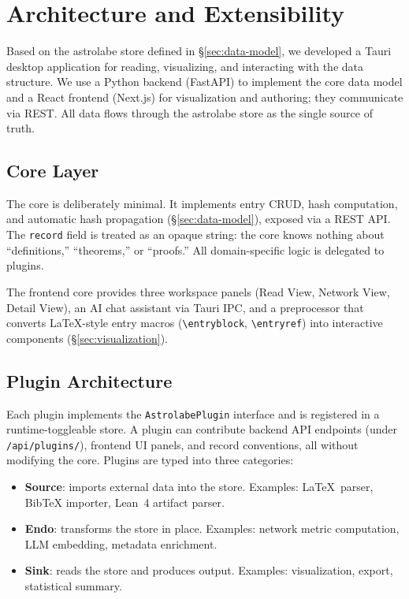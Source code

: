 \section{Architecture and Extensibility}
\label{sec:architecture}

Based on the astrolabe store defined in \S\ref{sec:data-model}, we developed a Tauri desktop application for reading, visualizing, and interacting with the data structure. We use a Python backend (FastAPI) to implement the core data model and a React frontend (Next.js) for visualization and authoring; they communicate via REST. All data flows through the astrolabe store as the single source of truth.

\subsection{Core Layer}

The core is deliberately minimal. It implements entry CRUD, hash computation, and automatic hash propagation (\S\ref{sec:data-model}), exposed via a REST API. The \texttt{record} field is treated as an opaque string: the core knows nothing about ``definitions,'' ``theorems,'' or ``proofs.'' All domain-specific logic is delegated to plugins.

The frontend core provides three workspace panels (Read View, Network View, Detail View), an AI chat assistant via Tauri IPC, and a preprocessor that converts \LaTeX-style entry macros (\verb|\entryblock|, \verb|\entryref|) into interactive components (\S\ref{sec:visualization}).

\subsection{Plugin Architecture}

Each plugin implements the \texttt{AstrolabePlugin} interface and is registered in a runtime-toggleable store. A plugin can contribute backend API endpoints (under \texttt{/api/plugins/}), frontend UI panels, and record conventions, all without modifying the core. Plugins are typed into three categories:
\begin{itemize}
  \item \textbf{Source}: imports external data into the store. Examples: \LaTeX\ parser, BibTeX importer, Lean~4 artifact parser.
  \item \textbf{Endo}: transforms the store in place. Examples: network metric computation, LLM embedding, metadata enrichment.
  \item \textbf{Sink}: reads the store and produces output. Examples: visualization, export, statistical summary.
\end{itemize}

